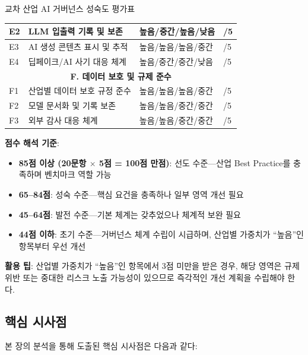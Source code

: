 \begin{practicaltool}{교차 산업 AI 거버넌스 성숙도 평가표}
\begin{table}[htbp]
\begin{tabularx}{\textwidth}{|p{0.5cm}|p{5cm}|X|p{1.2cm}|}
\hline
E2 & LLM 입출력 기록 및 보존 & 높음/중간/높음/낮음 & /5 \\
\hline
E3 & AI 생성 콘텐츠 표시 및 추적 & 높음/높음/높음/중간 & /5 \\
\hline
E4 & 딥페이크/AI 사기 대응 체계 & 높음/중간/중간/낮음 & /5 \\
\hline
\multicolumn{4}{|c|}{\textbf{F. 데이터 보호 및 규제 준수}} \\
\hline
F1 & 산업별 데이터 보호 규정 준수 & 높음/높음/높음/중간 & /5 \\
\hline
F2 & 모델 문서화 및 기록 보존 & 높음/높음/중간/중간 & /5 \\
\hline
F3 & 외부 감사 대응 체계 & 높음/높음/중간/중간 & /5 \\
\hline
\end{tabularx}
\end{table}

\textbf{점수 해석 기준}:
\begin{itemize}
 \item \textbf{85점 이상 (20문항 $\times$ 5점 = 100점 만점)}:
 선도 수준---산업 Best Practice를 충족하며 벤치마크 역할 가능
 \item \textbf{65--84점}:
 성숙 수준---핵심 요건을 충족하나 일부 영역 개선 필요
 \item \textbf{45--64점}:
 발전 수준---기본 체계는 갖추었으나 체계적 보완 필요
 \item \textbf{44점 이하}:
 초기 수준---거버넌스 체계 수립이 시급하며, 산업별 가중치가 ``높음''인 항목부터 우선 개선
\end{itemize}

\textbf{활용 팁}: 산업별 가중치가 ``높음''인 항목에서 3점 미만을 받은 경우,
해당 영역은 규제 위반 또는 중대한 리스크 노출 가능성이 있으므로
즉각적인 개선 계획을 수립해야 한다.
\end{practicaltool}


\subsection{핵심 시사점}
\label{sec:5.5.4}

본 장의 분석을 통해 도출된 핵심 시사점은 다음과 같다:

